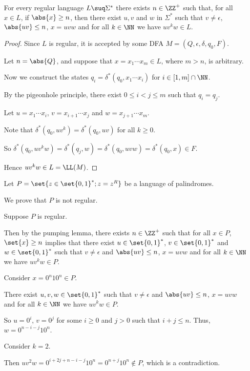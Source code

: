 \documentclass[11pt]{scrartcl}
\begin{document}
\begin{lemma}
  For every regular language $L \suq \Sigma^{*}$ there exists
  $n\in\ZZ^+$ such that, for all $x\in L$, if $\abs{x}\geq n$, then
  there exist $u, v$ and $w$ in $\Sigma^{*}$ such that
  $v\neq \epsilon$, $\abs{uv}\leq n$, $x = uvw$ and for all $k\in \NN$
  we have $uv^kw\in L$.
\end{lemma}
\begin{proof}
  \hfill

  Since $L$ is regular, it is accepted by some DFA
  $M = (Q, \epsilon, \delta, q_0, F)$.

  Let $n = \abs{Q}$, and suppose that $x = x_1\cdots x_m\in L$, where
  $m > n$, is arbitrary.

  Now we construct the states $q_i = \delta^{*}(q_0, x_1\cdots x_i)$
  for $i\in [1, m]\cap \NN$.

  By the pigeonhole principle, there exist $0 \leq i < j \leq m$ such
  that $q_i = q_j$.

  Let $u= x_1\cdots x_i$, $v = x_{i+1} \cdots x_j$ and
  $w = x_{j+1}\cdots x_m$.

  Note that $\delta^{*}(q_0, uv^k) = \delta^{*}(q_0, uv)$ for all
  $k \geq 0$.

  So
  $\delta^{*}(q_0, uv^kw) = \delta^{*}(q_j, w) = \delta^{*}(q_0, uvw)
  = \delta^{*}(q_0, x)\in F$.

  Hence $uv^kw \in L = \LL(M)$.
\end{proof}

\begin{example}

  Let $P = \set{z\in \set{0,1}^{*}; z = z^R}$ be a language of palindromes.

  We prove that $P$ is not regular.

  Suppose $P$ is regular. 

  Then by the pumping lemma, there exists $n\in \ZZ^+$ such that for
  all $x\in P$, $\set{x} \geq n$ implies that there exist
  $u\in \set{0, 1}^{*}$, $v \in \set{0, 1}^{*}$ and
  $w\in \set{0, 1}^{*}$ such that $v\neq \epsilon$ and
  $\abs{uv}\leq n$, $x = uvw$ and for all $k\in \NN$ we have
  $uv^kw\in P$.

  Consider $x = 0^n 1 0^n\in P$.

  There exist $u, v, w \in \set{0, 1}^{*}$ such that $v\neq \epsilon$
  and $\abs{uv}\leq n$, $x = uvw$ and for all $k\in \NN$ we have
  $uv^kw\in P$.

  So $u = 0^i$, $v = 0^j$ for some $i\geq 0$ and $j > 0$ such that
  $i+j \leq n$. Thus, $w = 0^{n-i-j}10^n$.

  Consider $k=2$.

  Then $uv^2w = 0^{i+2j+n-i-j}1 0^{n} = 0^{n+j}10^n\not\in P$, which is a contradiction.
\end{example}
\end{document}
